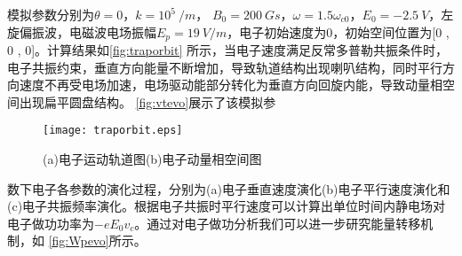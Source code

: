 模拟参数分别为$θ=0$，$k=10^5~/m$， $B_0=200~Gs$，$ω=1.5ω_{c0}$，$E_0=-2.5~V$，左旋偏振波，电磁波电场振幅$E_p=19~V/m$，电子初始速度为0，初始空间位置为[0   , 0   ,  0]。计算结果如\autoref{fig:traporbit} 所示，当电子速度满足反常多普勒共振条件时，电子共振约束，垂直方向能量不断增加，导致轨道结构出现喇叭结构，同时平行方向速度不再受电场加速，电场驱动能部分转化为垂直方向回旋内能，导致动量相空间出现扁平圆盘结构。 \autoref{fig:vtevo}展示了该模拟参
\begin{figure}
\centering
\texttt{[image: traporbit.eps]}
\caption{\label{fig:traporbit}(a)电子运动轨道图(b)电子动量相空间图}
\end{figure}
数下电子各参数的演化过程，分别为(a)电子垂直速度演化(b)电子平行速度演化和(c)电子共振频率演化。根据电子共振时平行速度可以计算出单位时间内静电场对电子做功功率为$-eE_0 v_c$。通过对电子做功分析我们可以进一步研究能量转移机制，如   \autoref{fig:Wpevo}所示。

